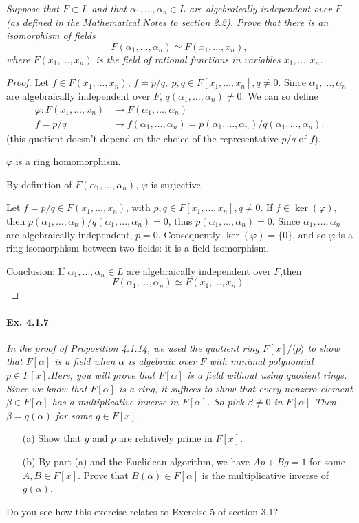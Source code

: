 \documentclass[11pt,a4paper]{article}
\begin{document}
{\it Suppose that $F\subset L$ and that $\alpha_1,\ldots,\alpha_n\in L$ are algebraically independent over $F$ (as defined in the Mathematical Notes to section 2.2). Prove that there is an isomorphism of fields
$$F(\alpha_1,\ldots,\alpha_n) \simeq F(x_1,\ldots,x_n),$$
where $F(x_1,\ldots,x_n)$ is the field of rational functions in variables $x_1,\ldots,x_n$.
}

\begin{proof}

Let $f \in F(x_1,\ldots,x_n)$, $f =p/q,\ p,q \in F[x_1,\ldots,x_n], q \neq 0$. Since $\alpha_1,\ldots,\alpha_n$ are algebraically independent over $F$, $q(\alpha_1,\ldots,\alpha_n) \neq 0$. We can so define
\begin{align*}
\varphi : F(x_1,\ldots,x_n) &\to F(\alpha_1,\ldots,\alpha_n)\\
 f = p/q  &\mapsto f(\alpha_1,\ldots,\alpha_n) = p(\alpha_1,\ldots,\alpha_n)/q(\alpha_1,\ldots,\alpha_n).
\end{align*}
(this quotient doesn't depend on the choice of the representative $p/q$ of $f$).

$\varphi$ is a ring homomorphism.

By definition of $F(\alpha_1,\ldots,\alpha_n)$, $\varphi$ is surjective.

Let $f = p/q \in F(x_1,\ldots,x_n)$, with $p,q \in F[x_1,\ldots,x_n], q\neq 0$. If $f \in \ker(\varphi)$, then $p(\alpha_1,\ldots,\alpha_n)/q(\alpha_1,\ldots,\alpha_n) =0$, thus $p(\alpha_1,\ldots,\alpha_n)=0$. Since $\alpha_1,\ldots,\alpha_n$ are algebraically independent, $p=0$. Consequently $\ker(\varphi) = \{0\}$, and so $\varphi$ is a ring isomorphism between two fields: it is a field isomorphism.

Conclusion: If $\alpha_1,\ldots,\alpha_n \in L$ are algebraically independent over $F$,then
$$F(\alpha_1,\ldots,\alpha_n) \simeq  F(x_1,\ldots,x_n).$$
\end{proof}

\paragraph{Ex. 4.1.7}

{\it In the proof of Proposition 4.1.14, we used the quotient ring $F[x]/\langle p\rangle$ to show that $F[\alpha]$ is a field when $\alpha$ is algebraic over $F$ with minimal polynomial $p \in F[x]$.Here, you will prove that $F[\alpha]$ is a field without using quotient rings. Since we know that $F[\alpha]$ is a ring, it suffices to show that every nonzero element $\beta \in F[\alpha]$ has a multiplicative inverse in $F[\alpha]$. So pick $\beta \ne 0$ in $F[\alpha]$ Then $\beta = g(\alpha)$ for some $g \in F[x]$.
\begin{enumerate}
\item[(a)] Show that $g$ and $p$ are relatively prime in $F[x]$.
\item[(b)] By part (a) and the Euclidean algorithm, we have $Ap+Bg = 1$ for some $A,B \in F[x]$. Prove that $B(\alpha) \in F[\alpha]$ is the multiplicative inverse of $g(\alpha)$.
\end{enumerate}
Do you see how this exercise relates to Exercise 5 of section 3.1?
}
\end{document}
